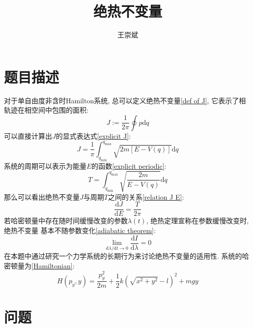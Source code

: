 \documentclass[a4paper,zihao=5,UTF8]{ctexart}
\title{\textbf{绝热不变量}}
\author{王崇斌\;1800011716}
\def\d{\mathrm{d}}
\newcommand{\mr}[1]{\mathrm{#1}}
\newcommand{\dv}[2]{\frac{\d{#1}}{\d{#2}}}
\begin{document}
	\pagestyle{fancy}
	\pagestyle{fancy}
	\chead{}
	\rhead{\today}
	\maketitle
    \thispagestyle{fancy}
    \tableofcontents
    \section{题目描述}
    对于单自由度非含时Hamilton系统, 总可以定义绝热不变量\ref{def of J}, 它表示了相轨迹在相空间中包围的面积:
    \begin{equation}
        J := \frac{1}{2\pi}\oint p\d q
        \label{def of J}
    \end{equation}
    可以直接计算出$J$的显式表达式\ref{explicit J}:
    \begin{equation}
        J = \frac{1}{\pi}\int_{q_{\mr{min}}}^{q_{\mr{max}}}\sqrt{2m[E - V(q)]}\d q
        \label{explicit J}
    \end{equation}
    系统的周期可以表示为能量$E$的函数\ref{explicit periodic}:
    \begin{equation}
        T = \int_{q_{\mr{min}}}^{q_{\mr{max}}}\sqrt{\frac{2m}{E - V(q)}} \d q
        \label{explicit periodic}
    \end{equation}
    那么可以看出绝热不变量$J$与周期$T$之间的关系\ref{relation J E}:
    \begin{equation}
        \dv{J}{E} = \frac{T}{2\pi}
        \label{relation J E}
    \end{equation}
    若哈密顿量中存在随时间缓慢改变的参数$\lambda(t)$, 绝热定理宣称在参数缓慢改变时, 绝热不变量
    基本不随参数变化\ref{adiabatic theorem}:
    \begin{equation}
        \lim_{\d \lambda / \d t \to 0}\dv{I}{\lambda} = 0
        \label{adiabatic theorem}
    \end{equation}
    在本题中通过研究一个力学系统的长期行为来讨论绝热不变量的适用性.
    系统的哈密顿量为\ref{Hamiltonian}:
    \begin{equation}
        H(p_y, y) = \frac{p_y^2}{2m} + \frac{1}{2}k\left(\sqrt{x^2 + y^2} - l\right)^2 + mgy
        \label{Hamiltonian}
    \end{equation}
    \section{问题}
\end{document}
